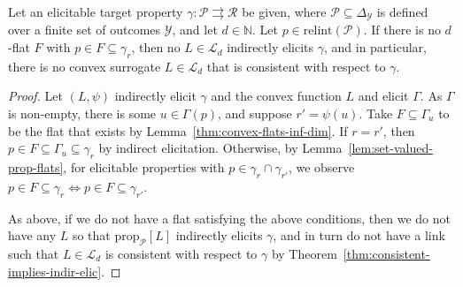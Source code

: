 \documentclass[anon,12pt]{colt2021} %
\newcommand{\Comments}{1}
\newcommand{\mynote}[2]{\ifnum\Comments=1\textcolor{#1}{#2}\fi}
\newcommand{\jessie}[1]{\mynote{purple}{[JF: #1]}}
\newcommand{\simplex}{\Delta_\Y}
\newcommand{\relint}[1]{\mathrm{relint}(#1)}
\newcommand{\prop}[2][\mathcal{P}]{\mathrm{prop}_{#1}[#2]}
\newcommand{\range}{\mathrm{range}\,}
\newcommand{\Pcodimension}{$\mathcal{P}$-codimension\,}
\renewcommand{\L}{\mathcal{L}}
\newcommand{\R}{\mathcal{R}}
\renewcommand{\P}{\mathcal{P}}
\newcommand{\Y}{\mathcal{Y}}
\newcommand{\toto}{\rightrightarrows}
\begin{document}

\begin{corollary}\label{cor:Pcodim-flat-elic-relint-prop} 
  Let an elicitable target property $\gamma:\P \toto \R$ be given, where $\P\subseteq\simplex$ is defined over a finite set of outcomes $\Y$, and let $d\in\mathbb N$.
Let $p \in \relint{\P}$.
If there is no $d$-flat $F$ with $p \in F \subseteq \gamma_r$, then no $L\in\L_d$ indirectly elicits $\gamma$, and in particular, there is no convex surrogate $L \in \L_d$ that is consistent with respect to $\gamma$.
%
\end{corollary}
\begin{proof}
	Let $(L, \psi)$ indirectly elicit $\gamma$ and the convex function $L$ and elicit $\Gamma$.
	As $\Gamma$ is non-empty, there is some $u \in \Gamma(p)$, and suppose $r' = \psi(u)$.
	Take $F \subseteq \Gamma_u$ to be the flat that exists by Lemma~\ref{thm:convex-flats-inf-dim}.
	If $r = r'$, then $p \in F \subseteq \Gamma_u \subseteq \gamma_r$ by indirect elicitation.
	Otherwise, by Lemma~\ref{lem:set-valued-prop-flats}, for elicitable properties with $p \in \gamma_r \cap \gamma_{r'}$, we observe $p \in F\subseteq \gamma_r \iff p \in F \subseteq \gamma_{r'}$.
	
	As above, if we do not have a flat satisfying the above conditions, then we do not have any $L$ so that $\prop{L}$ indirectly elicits $\gamma$, and in turn do not have a link such that $L \in \L_d$ is consistent with respect to $\gamma$ by Theorem~\ref{thm:consistent-implies-indir-elic}.
\end{proof}
\end{document}
